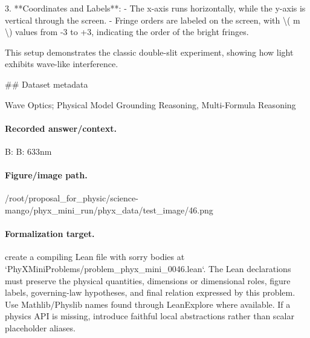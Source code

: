 3. **Coordinates and Labels**:
   - The x-axis runs horizontally, while the y-axis is vertical through the screen.
   - Fringe orders are labeled on the screen, with \textbackslash{}( m \textbackslash{}) values from -3 to +3, indicating the order of the bright fringes.

This setup demonstrates the classic double-slit experiment, showing how light exhibits wave-like interference.

\#\# Dataset metadata

Wave Optics; Physical Model Grounding Reasoning, Multi-Formula Reasoning

\paragraph{Recorded answer/context.}
B: B: 633nm

\paragraph{Figure/image path.}
/root/proposal\_for\_physic/science-mango/phyx\_mini\_run/phyx\_data/test\_image/46.png

\paragraph{Formalization target.}
create a compiling Lean file with sorry bodies at `PhyXMiniProblems/problem\_phyx\_mini\_0046.lean`. The Lean declarations must preserve the physical quantities, dimensions or dimensional roles, figure labels, governing-law hypotheses, and final relation expressed by this problem.
Use Mathlib/Physlib names found through LeanExplore where available. If a physics API is missing, introduce faithful local abstractions rather than scalar placeholder aliases.

